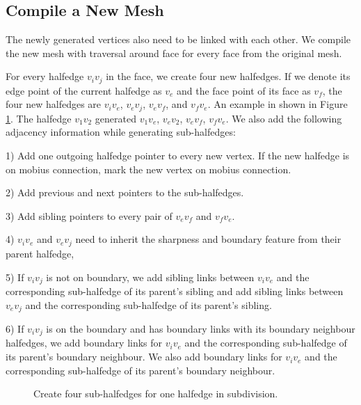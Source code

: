\documentclass[12pt]{article}
\begin{document}
\subsection{Compile a New Mesh}
The newly generated vertices also need to be linked with each other. We compile the new mesh with traversal around face for every face from the original mesh.

For every halfedge $v_iv_j$ in the face, we create four new halfedges. If we denote its edge point of the current halfedge as $v_e$ and the face point of its face as $v_f$, the four new halfedges are $v_iv_e$, $v_ev_j$, $v_ev_f$, and $v_fv_e$. An example in shown in Figure \ref{figure:compileNewMesh}. The halfedge $v_1v_2$ generated $v_1v_e$, $v_ev_2$, $v_ev_f$, $v_fv_e$. We also add the following adjacency information while generating sub-halfedges: 

1) Add one outgoing halfedge pointer to every new vertex. If the new halfedge is on mobius connection, mark the new vertex on mobius connection.

2) Add previous and next pointers to the sub-halfedges. 

3) Add sibling pointers to every pair of $v_ev_f$ and $v_fv_e$.

4) $v_iv_e$ and $v_ev_j$ need to inherit the sharpness and boundary feature from their parent halfedge, 

5) If $v_iv_j$ is not on boundary, we add sibling links between $v_iv_e$ and the corresponding sub-halfedge of its parent's sibling and add sibling links between $v_ev_j$ and the corresponding sub-halfedge of its parent's sibling.

6) If $v_iv_j$ is on the boundary and has boundary links with its boundary neighbour halfedges, we add boundary links for $v_iv_e$ and the corresponding sub-halfedge of its parent's boundary neighbour. We also add boundary links for $v_iv_e$ and the corresponding sub-halfedge of its parent's boundary neighbour.

\begin{figure}[ht]
  \centering
  \caption{Create four sub-halfedges for one halfedge in subdivision.}
  \label{figure:compileNewMesh}
\end{figure}
\end{document}
